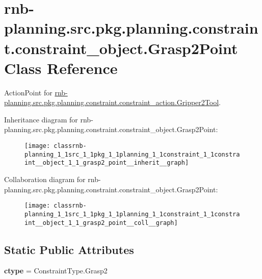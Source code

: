 \hypertarget{classrnb-planning_1_1src_1_1pkg_1_1planning_1_1constraint_1_1constraint__object_1_1_grasp2_point}{}\section{rnb-\/planning.src.\+pkg.\+planning.\+constraint.\+constraint\+\_\+object.\+Grasp2\+Point Class Reference}
\label{classrnb-planning_1_1src_1_1pkg_1_1planning_1_1constraint_1_1constraint__object_1_1_grasp2_point}


Action\+Point for \hyperlink{classrnb-planning_1_1src_1_1pkg_1_1planning_1_1constraint_1_1constraint__action_1_1_gripper2_tool}{rnb-\/planning.\+src.\+pkg.\+planning.\+constraint.\+constraint\+\_\+action.\+Gripper2\+Tool}.  




Inheritance diagram for rnb-\/planning.src.\+pkg.\+planning.\+constraint.\+constraint\+\_\+object.\+Grasp2\+Point\+:
\nopagebreak
\begin{figure}[H]
\begin{center}
\leavevmode
\texttt{[image: classrnb-planning\_1\_1src\_1\_1pkg\_1\_1planning\_1\_1constraint\_1\_1constraint\_\_object\_1\_1\_grasp2\_point\_\_inherit\_\_graph]}
\end{center}
\end{figure}


Collaboration diagram for rnb-\/planning.src.\+pkg.\+planning.\+constraint.\+constraint\+\_\+object.\+Grasp2\+Point\+:
\nopagebreak
\begin{figure}[H]
\begin{center}
\leavevmode
\texttt{[image: classrnb-planning\_1\_1src\_1\_1pkg\_1\_1planning\_1\_1constraint\_1\_1constraint\_\_object\_1\_1\_grasp2\_point\_\_coll\_\_graph]}
\end{center}
\end{figure}
\subsection*{Static Public Attributes}
\begin{DoxyCompactItemize}
\item 
\mbox{\label{classrnb-planning_1_1src_1_1pkg_1_1planning_1_1constraint_1_1constraint__object_1_1_grasp2_point_ae5898049b41155fd6821c5c28e6392cc}} 
{\bfseries ctype} = Constraint\+Type.\+Grasp2
\end{DoxyCompactItemize}
